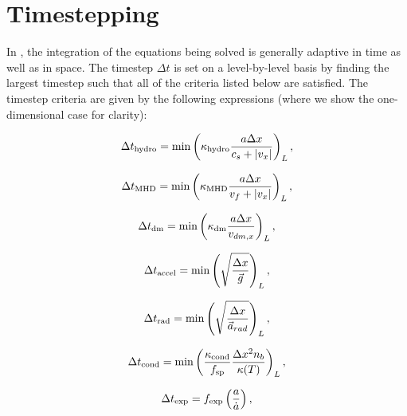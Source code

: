 \section{Timestepping}
\label{sec.timestepping}

In \enzo, the integration of the equations being solved is generally adaptive in time 
as well as in space.  The timestep $\Delta t$ is set on a level-by-level
basis by finding the largest timestep such that all of the criteria listed below are
satisfied.  The timestep criteria are given by the following expressions
(where we show the one-dimensional case for clarity):

\begin{equation}
\Delta t_{\rm hydro} = \min \left( \kappa_{\rm hydro} \frac{a \Delta x}{c_{s} + |v_x|} \right)_L ,
\label{eqn:dthydro}
\end{equation}

\begin{equation}
\Delta t_{\rm MHD} = \min \left( \kappa_{\rm MHD} \frac{a \Delta x}{v_{f} + |v_x|} \right)_L ,
\label{eqn:dtMHD}
\end{equation}

\begin{equation}
\Delta t_{\rm dm} = \min \left(\kappa_{\rm dm} \frac{a \Delta x}{v_{dm,x}} \right)_L ,
\label{eqn:dtdarkmatter}
\end{equation}

\begin{equation}
\Delta t_{\rm accel} = \min \left( \sqrt{\frac{\Delta x}{\vec{g}}} \right)_L ,
\label{eqn:dtaccel}
\end{equation}

\begin{equation}
\Delta t_{\rm rad} = \min \left(  \sqrt{\frac{\Delta x}{\vec{a}_{rad}}} \right)_L,
\label{eqn:dtrad}
\end{equation}

\begin{equation}
\Delta t_{\rm cond} = \min \left(  \frac{ \kappa_{\rm cond}}{f_{\rm sp}} \frac{\Delta x^2
    n_b}{\kappa(T)} \right)_L,
\label{eqn:dtcond}
\end{equation}

\begin{equation}
\Delta t_{\rm exp} = f_{\rm exp} \left( \frac{a}{\dot{a}} \right) ,
\label{eqn:dtexpand}
\end{equation}


